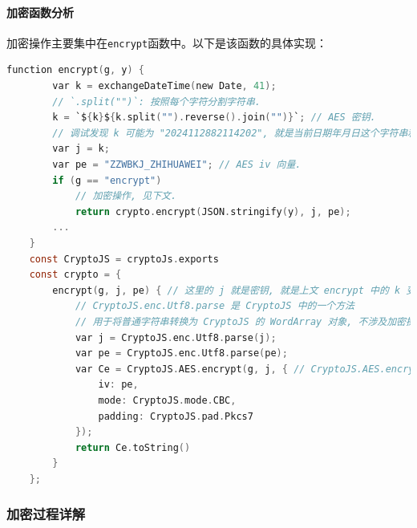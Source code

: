 \documentclass[14pt,a4paper,UTF8,twoside]{article}
\begin{document}
\paragraph{加密函数分析}

加密操作主要集中在\texttt{encrypt}函数中。以下是该函数的具体实现：

\begin{lstlisting}[language=C, caption=加密函数代码]
    function encrypt(g, y) {
        var k = exchangeDateTime(new Date, 41);
        // `.split("")`: 按照每个字符分割字符串.
        k = `${k}${k.split("").reverse().join("")}`; // AES 密钥.
        // 调试发现 k 可能为 "2024112882114202", 就是当前日期年月日这个字符串和他的倒转相加.
        var j = k;
        var pe = "ZZWBKJ_ZHIHUAWEI"; // AES iv 向量.
        if (g == "encrypt")
            // 加密操作, 见下文.
            return crypto.encrypt(JSON.stringify(y), j, pe);
        ...
    }
    const CryptoJS = cryptoJs.exports
    const crypto = {
        encrypt(g, j, pe) { // 这里的 j 就是密钥, 就是上文 encrypt 中的 k 变量.
            // CryptoJS.enc.Utf8.parse 是 CryptoJS 中的一个方法
            // 用于将普通字符串转换为 CryptoJS 的 WordArray 对象, 不涉及加密操作.
            var j = CryptoJS.enc.Utf8.parse(j);
            var pe = CryptoJS.enc.Utf8.parse(pe);
            var Ce = CryptoJS.AES.encrypt(g, j, { // CryptoJS.AES.encrypt(message, key, options)
                iv: pe,
                mode: CryptoJS.mode.CBC,
                padding: CryptoJS.pad.Pkcs7
            });
            return Ce.toString()
        }
    };
\end{lstlisting}

\subsubsection*{加密过程详解}
\end{document}
